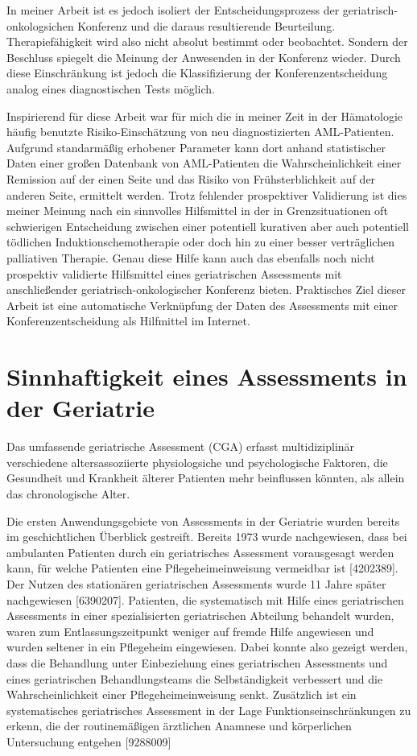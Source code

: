 In meiner Arbeit ist es jedoch isoliert der Entscheidungsprozess der
geriatrisch-onkologsichen Konferenz und die daraus resultierende
Beurteilung. Therapiefähigkeit wird also nicht absolut bestimmt oder
beobachtet. Sondern der Beschluss spiegelt die Meinung der Anwesenden
in der Konferenz wieder. Durch diese Einschränkung ist jedoch die
Klassifizierung der Konferenzentscheidung analog eines diagnostischen
Tests möglich.

Inspirierend für diese Arbeit war für mich die in meiner Zeit in der
Hämatologie häufig benutzte Risiko-Einschätzung von neu
diagnostizierten AML-Patienten. Aufgrund standarmäßig erhobener
Parameter kann dort anhand statistischer Daten einer großen Datenbank
von AML-Patienten die Wahrscheinlichkeit einer Remission auf der einen
Seite und das Risiko von Frühsterblichkeit auf der anderen Seite,
ermittelt werden. Trotz fehlender prospektiver Validierung ist dies
meiner Meinung nach ein sinnvolles Hilfsmittel in der in
Grenzsituationen oft schwierigen Entscheidung zwischen einer
potentiell kurativen aber auch potentiell tödlichen
Induktionschemotherapie oder doch hin zu einer besser verträglichen
palliativen Therapie. Genau diese Hilfe kann auch das ebenfalls noch
nicht prospektiv validierte Hilfsmittel eines geriatrischen
Assessments mit anschließender geriatrisch-onkologischer Konferenz
bieten. Praktisches Ziel dieser Arbeit ist eine automatische
Verknüpfung der Daten des Assessments mit einer Konferenzentscheidung
als Hilfmittel im Internet.

\section{Sinnhaftigkeit eines Assessments in der Geriatrie}

Das umfassende geriatrische Assessment (CGA) erfasst multidiziplinär
verschiedene  altersassoziierte physiologsiche und psychologische
Faktoren, die Gesundheit und Krankheit älterer Patienten mehr
beinflussen könnten, als allein das chronologische Alter.

Die ersten Anwendungsgebiete von Assessments in der Geriatrie wurden
bereits im geschichtlichen Überblick gestreift. Bereits 1973 wurde
nachgewiesen, dass bei ambulanten Patienten durch ein geriatrisches
Assessment vorausgesagt werden kann, für welche Patienten eine
Pflegeheimeinweisung vermeidbar ist [4202389]. Der Nutzen des
stationären geriatrischen Assessments wurde 11 Jahre später
nachgewiesen [6390207]. Patienten, die systematisch mit Hilfe eines
geriatrischen Assessments in einer spezialisierten geriatrischen
Abteilung behandelt wurden, waren zum Entlassungszeitpunkt weniger auf
fremde Hilfe angewiesen und wurden seltener in ein Pflegeheim
eingewiesen. Dabei konnte also gezeigt werden, dass die Behandlung
unter Einbeziehung eines geriatrischen Assessments und eines
geriatrischen Behandlungsteams die Selbständigkeit verbessert und die
Wahrscheinlichkeit einer Pflegeheimeinweisung senkt. Zusätzlich ist
ein systematisches geriatrisches Assessment in der Lage
Funktionseinschränkungen zu erkenn, die der routinemäßigen ärztlichen
Anamnese und körperlichen Untersuchung entgehen [9288009]

